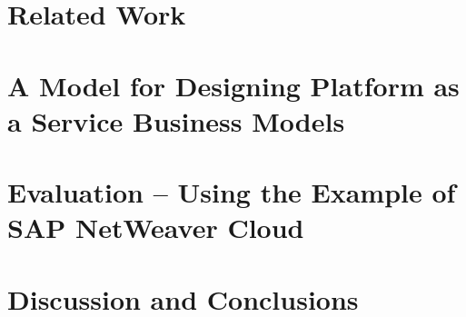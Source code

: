 \documentclass[12pt,a4paper,oneside,notitlepage,USenglish]{scrreprt}
\begin{document}
			\chapter{Related Work}\label{ch:rw}


			
			\chapter{A Model for Designing Platform as a Service Business Models}\label{ch:dm}

			\chapter{Evaluation -- Using the Example of SAP NetWeaver Cloud}\label{ch:esap}

			\chapter{Discussion and Conclusions}\label{ch:dc}













\appendix
\titleformat{\chapter}{\Large}{\textbf{\appendixname~\Large\thechapter}}{15pt}{\textbf}


\end{document}
